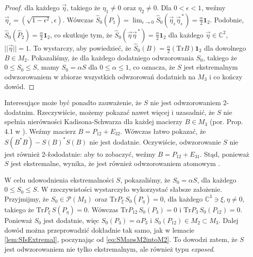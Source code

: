 {\begin{proof}
dla każdego $\vec{\eta}$, takiego że $\eta_{1} \neq 0$ oraz $\eta_{2} \neq 0$.
Dla $0 \!<\!\epsilon \!<\! 1$,
weźmy $\vec{\eta}_{\epsilon} = (\sqrt{1 - \epsilon^{2}}, \epsilon)$.
Wówczas $\hat{S}_{0} (\hat{P}_{1}) =
\lim_{\epsilon \rightarrow 0} \hat{S}_{0}
    (\vec{\eta}_{\epsilon} \vec{\eta}_{\epsilon}^{\,*}) =
\frac{\alpha}{2} \mathbf{1}_{2}$.
Podobnie,
$\hat{S}_{0} (\hat{P}_{2}) = \frac{\alpha}{2} \mathbf{1}_{2}$,
co skutkuje tym, że
$\hat{S}_{0} (\vec{\eta} \vec{\eta}^{\,*}) = \frac{\alpha}{2} \mathbf{1}_{2}$
dla każdego $\vec{\eta} \in \mathbb{C}^{2}$,
$||\vec{\eta}|| = 1$.
To wystarczy, aby powiedzieć, że
$\hat{S}_{0}(B) = \frac{\alpha}{2} (\text{Tr} B) \mathbf{1}_{2}$
dla dowolnego $B \in M_{2}$.
Pokazaliśmy, że dla każdego dodatniego odwzorowania $S_{0}$, takiego że
$0 \leq S_{0} \leq S$, mamy
$S_{0} = \alpha S$ dla $0 \leq \alpha \leq 1$,
co oznacza, że $S$ jest ekstremalnym odwzorowaniem w zbiorze wszystkich
odwzorowań dodatnich na $M_{3}$ i co kończy dowód.
\end{proof}

Interesujące może być ponadto zauważenie, że $S$ nie jest odwzorowaniem
2-dodatnim.
Rzeczywiście,
możemy pokazać nawet więcej i uzasadnić, że $S$
nie spełnia nierówności Kadisona-Schwarza dla każdej macierzy
$B \in M_{3}$ (por. Prop.\,4.1 w \cite{choi1980some}).
Weźmy macierz
$B = P_{12} + E_{32}$.
Wówczas łatwo pokazać, że
$S(B^{*} B) - S(B)^{*} S(B)$
nie jest dodatnie.
Oczywiście, odwzorowanie $S$ nie jest również 2-\emph{ko}dodatnie:
aby to zobaczyć, weźmy $B = P_{12} + E_{31}$.
Stąd, ponieważ $S$ jest ekstremalne,
wynika, że jest również odwzorowaniem atomowym
\cite{ha1998atomic}.

W celu udowodnienia ekstremalności $S$,
pokazaliśmy, że $S_{0} = \alpha S$,
dla każdego $0 \leq S_{0} \leq S$.
W rzeczywistości wystarczyło wykorzystać słabsze założenie.
Przyjmijmy, że $S_{0} \in \mathcal{P}(M_{3})$ oraz
$\text{Tr} P_{\xi} \, S_{0}(P_{\eta}) = 0$,
dla każdego $\mathbb{C}^{3} \ni \xi,\eta \neq 0$,
takiego że $\text{Tr} P_{\xi} \, S(P_{\eta}) = 0$.
Wówczas $\text{Tr} P_{12} \, S_{0}(P_{3}) = 0$ i
$\text{Tr} P_{3} \, S_{0}(P_{12}) = 0$.
Ponieważ $S_{0}$ jest dodatnie, więc $S_{0}(P_{3}) = \alpha P_{3}$
i $S_{0}(P_{12}) \in M_{2} \! \subset \! M_{3}$.
Dalej dowód można przeprowadzić dokładnie tak samo, jak w
lemacie \ref{lem:SIsExtremal},
poczynając od \eqref{eq:SMapsM2intoM2}.
To dowodzi zatem, że $S$ jest odwzorowaniem nie tylko ekstremalnym,
ale również typu \emph{exposed}.

\vspace{0.5cm}

}
